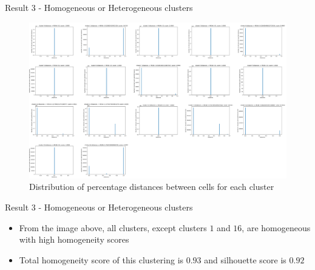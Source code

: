 \documentclass{beamer}
\begin{document}
\begin{frame}{Result 3 - Homogeneous or Heterogeneous clusters}

\begin{figure}
    \centering
    \includegraphics[width=1\textwidth]{stats_clusters5.png}
    \caption{Distribution of percentage distances between cells for each cluster}
\end{figure} 

\end{frame}
\begin{frame}{Result 3 - Homogeneous or Heterogeneous clusters}

\begin{itemize}
    \item<1-> From the image above, all clusters, except clusters $1$ and $16$, are homogeneous with high homogeneity scores
    \item<2-> Total homogeneity score of this clustering is $0.93$ and silhouette score is $0.92$
\end{itemize}
\end{frame}
\end{document}
